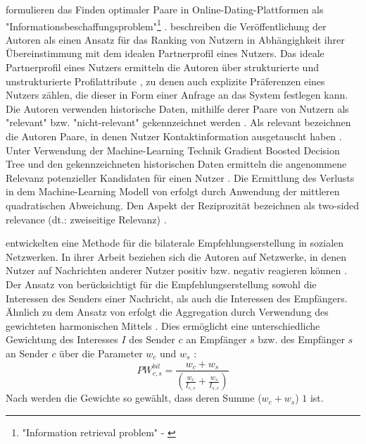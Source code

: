 \textcite[S. 66ff.]{diaz:inproceedings} formulieren das Finden optimaler Paare in Online-Dating-Plattformen als "Informationsbeschaffungsproblem"\footnote{"Information retrieval problem" - \textcite[S. 67]{diaz:inproceedings}} \cite[S. 550]{koprinska:inbook}.
\textcite[S. 550]{koprinska:inbook} beschreiben die Veröffentlichung der Autoren als einen Ansatz für das Ranking von Nutzern in Abhängighkeit ihrer Übereinstimmung mit dem idealen Partnerprofil eines Nutzers.
Das ideale Partnerprofil eines Nutzers ermitteln die Autoren über strukturierte und unstrukturierte Profilattribute \cite[S. 288]{li:article}\cite[S. 272]{pizzato:2:inproceedings}, zu denen auch explizite Präferenzen eines Nutzers zählen, die dieser in Form einer Anfrage an das System festlegen kann.
Die Autoren verwenden historische Daten, mithilfe derer Paare von Nutzern als "relevant" bzw. "nicht-relevant" gekennzeichnet werden \cite[S. 288]{li:article}.
Als relevant bezeichnen die Autoren Paare, in denen Nutzer Kontaktinformation ausgetauscht haben \cite[S. 66ff.]{diaz:inproceedings}.
Unter Verwendung der Machine-Learning Technik Gradient Boosted Decision Tree und den gekennzeichneten historischen Daten ermitteln \textcite[S. 69]{diaz:inproceedings} die angenommene Relevanz potenzieller Kandidaten für einen Nutzer \cite[S. 550]{koprinska:inbook}.
Die Ermittlung des Verlusts in dem Machine-Learning Modell von \textcite[S. 69]{diaz:inproceedings} erfolgt durch Anwendung der mittleren quadratischen Abweichung.
Den Aspekt der Reziprozität bezeichnen \textcite[S. 66]{diaz:inproceedings} als two-sided relevance (dt.: zweiseitige Relevanz) \cite[S. 550]{koprinska:inbook}.

\textcite[S. 247ff.]{kim:2:inproceedings} entwickelten eine Methode für die bilaterale Empfehlungserstellung in sozialen Netzwerken.
In ihrer Arbeit beziehen sich die Autoren auf Netzwerke, in denen Nutzer auf Nachrichten anderer Nutzer positiv bzw. negativ reagieren können \cite[S. 548]{koprinska:inbook}.
Der Ansatz von \textcite[S. 247ff.]{kim:2:inproceedings} berücksichtigt für die Empfehlungserstellung sowohl die Interessen des Senders einer Nachricht, als auch die Interessen des Empfängers.
Ähnlich zu dem Ansatz von \textcite[S. 207ff.]{pizzato:2010} erfolgt die Aggregation durch Verwendung des gewichteten harmonischen Mittels \cite[S. 251]{kim:2:inproceedings}.
Dies ermöglicht eine unterschiedliche Gewichtung des Interesses $I$ des Sender $c$ an Empfänger $s$ bzw. des Empfänger $s$ an Sender $c$ über die Parameter $w_{c}$ und $w_{s}$ \cite[S. 251]{kim:2:inproceedings}:
\begin{equation}\label{eq34}
    PW_{c,s}^{bil} = \frac{w_{c}+w_{s}}{(\frac{w_{c}}{I_{c,s}}+\frac{w_{s}}{I_{s,c}})}
\end{equation}
Nach \textcite[S. 219]{kim:2:inproceedings} werden die Gewichte so gewählt, dass deren Summe ($w_{c}+w_{s}$) $1$ ist.

